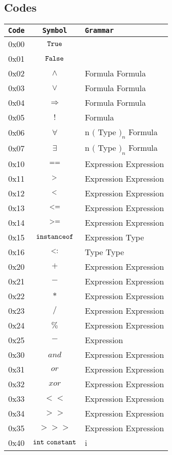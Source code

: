 \begin{appendix}
\subsection{Codes}
\begin{center}
\begin{tabular}[t]{|c|c|l|}
\hline
\texttt{Code}&\texttt{Symbol}&\texttt{Grammar}\\
\hline
0x00 & $\tt{True}$  & \\
0x01 & $\tt{False}$ &\\
0x02 & $\wedge$ & Formula Formula \\
0x03 & $\vee$ & Formula Formula \\
0x04 & $\Rightarrow$ & Formula Formula \\
0x05 & $!$ & Formula\\
0x06 & $\forall$ & n $($ Type $)_n$ Formula \\
0x07 & $\exists$ & n $($ Type $)_n$ Formula \\
0x10 & $\tt{==} $ & Expression Expression \\ 
0x11 & $\tt{> } $ & Expression Expression \\
0x12 & $\tt{<}  $ & Expression Expression \\
0x13 & $\tt{<=} $ & Expression Expression \\
0x14 & $\tt{>= }$ & Expression Expression \\
0x15 & $\tt{instanceof }$ & Expression Type \\
0x16 & $\tt{<:}$ & Type Type \\
0x20 & $+$ & Expression Expression \\
0x21 & $-$ & Expression Expression \\
0x22 & $*$ & Expression Expression \\
0x23 & $/$ & Expression Expression \\
0x24 & $\%$ & Expression Expression \\
0x25 & $-$ & Expression \\
0x30 & $and$ & Expression Expression \\
0x31 & $or$ & Expression Expression \\
0x32 & $xor$ & Expression Expression \\
0x33 & $<<$ & Expression Expression \\
0x34 & $>>$ & Expression Expression \\
0x35 & $>>>$ & Expression Expression \\
0x40 & $\tt{int \ constant}$ & i \\

\end{tabular}
\end{center}
\end{appendix}
